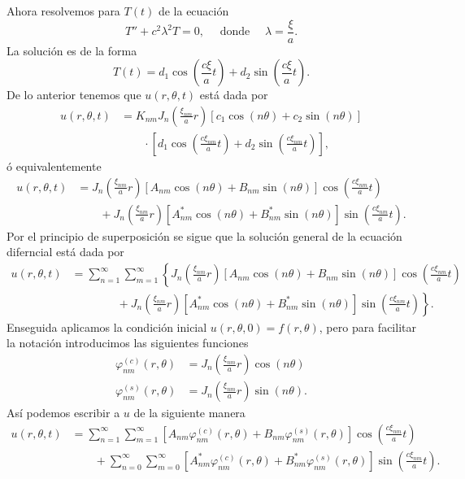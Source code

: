\documentclass[11pt,letterpaper]{report}
\newcommand\<{\langle}
\renewcommand\>{\rangle}
\renewcommand\phi\varphi
\begin{document}
\noindent Ahora resolvemos para $T(t)$ de la ecuación
\[
  T'' + c^2\lambda^2T = 0, \quad \text{ donde } \quad \lambda = \frac{\xi}{a}.
\] La solución es de la forma
\[
  T(t) = d_1 \cos\left(\frac{c\xi}{a}t\right) + d_2 \sin\left(\frac{c\xi}{a} t\right).
\] De lo anterior tenemos que $u(r,\theta,t)$ está dada por
\begin{align*}
  u(r,\theta,t) &= K_{nm} J_n\left(\frac{\xi_{nm}}{a}r\right)\left[c_1 \cos(n\theta) + c_2 \sin(n\theta)\right]\\
                &\quad\quad \cdot \left[d_1 \cos\left(\frac{c\xi_{nm}}{a}t\right) + d_2 \sin\left(\frac{c\xi_{nm}}{a}t\right)\right],
\end{align*}
ó equivalentemente
\begin{align*}
  u(r,\theta,t) &= J_n\left(\frac{\xi_{nm}}{a}r\right)\left[A_{nm}\cos(n\theta) + B_{nm}\sin(n\theta)\right]\cos\left(\frac{c\xi_{nm}}{a}t\right)\\
                &\quad\quad + J_n\left(\frac{\xi_{nm}}{a}r\right)\left[A_{nm}^{\ast}\cos(n\theta) + B_{nm}^{\ast}\sin(n\theta)\right]\sin\left(\frac{c\xi_{nm}}{a}t\right).
\end{align*} 
Por el principio de superposición se sigue que la solución general de la ecuación diferncial está dada por
\begin{align*}
  u(r,\theta,t) &= \sum_{n=1}^{\infty}\sum_{m=1}^{\infty} \left\{ J_n\left(\frac{\xi_{nm}}{a}r\right)\left[A_{nm}\cos(n\theta) + B_{nm}\sin(n\theta)\right]\cos\left(\frac{c\xi_{nm}}{a}t\right)\right.\\
                &\quad\quad\quad\quad + \left.J_n\left(\frac{\xi_{nm}}{a}r\right)\left[A_{nm}^{\ast}\cos(n\theta) + B_{nm}^{\ast}\sin(n\theta)\right]\sin\left(\frac{c\xi_{nm}}{a}t\right)\right\}.
\end{align*} 
Enseguida aplicamos la condición inicial $u(r,\theta,0) = f(r,\theta)$, pero para facilitar la notación introducimos las siguientes funciones
\begin{align*}
  \phi_{nm}^{(c)}(r,\theta) &= J_n\left(\frac{\xi_{nm}}{a} r\right)\cos(n\theta)\\
  \phi_{nm}^{(s)}(r,\theta) &= J_n\left(\frac{\xi_{nm}}{a}r\right)\sin(n\theta).
\end{align*} Así podemos escribir a $u$ de la siguiente manera
\begin{align*}
  u(r,\theta,t) &= \sum_{n=1}^{\infty}\sum_{m=1}^{\infty}
              \left[
              A_{nm}\phi_{nm}^{(c)}(r,\theta)
              + B_{nm}\phi_{nm}^{(s)}(r,\theta)
              \right]
              \cos
              \left(
              \frac{c\xi_{nm}}{a}t
              \right)\\
           &\quad\quad + \sum_{n=0}^{\infty}\sum_{m=0}^{\infty}
              \left[
              A_{nm}^{\ast}\phi_{nm}^{(c)}(r,\theta)
              + B_{nm}^{\ast}\phi_{nm}^{(s)}(r,\theta)
              \right]
              \sin
              \left(
              \frac{c\xi_{nm}}{a}t
              \right).
\end{align*}
\end{document}
